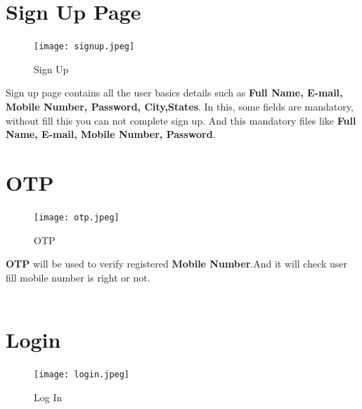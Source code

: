 \documentclass[twoside,a4paper,16pt]{book}
\begin{document}
\begin{itemize}
\begin{enumerate}
\begin{enumerate}
\newpage

\section{Sign Up Page}

\vspace{0.6cm}

\begin{figure}[ht!]
\begin{center}
\texttt{[image: signup.jpeg]}
\caption{Sign Up}
\end{center}
\end{figure}

 \vspace{0.2cm}


Sign up page contains all the user basics details such as {\bf Full Name, E-mail, Mobile Number, Password, City,States}. In this, some fields are mandatory, without fill this you can not complete sign up. And this mandatory files like {\bf  Full Name, E-mail, Mobile Number, Password}.



\newpage
\section{OTP}

\vspace{0.6cm}

\begin{figure}[ht!]
\begin{center}
\texttt{[image: otp.jpeg]}
\caption{OTP}
\end{center}
\end{figure}

 \vspace{0.2cm}


{\bf OTP} will be used to verify registered {\bf Mobile Number}.And it will check user fill mobile number is right or not.\\\\


\newpage
\section{Login}

\vspace{0.6cm}

\begin{figure}[ht!]
\begin{center}
\texttt{[image: login.jpeg]}
\caption{Log In}
\end{center}
\end{figure}


\end{enumerate}
\end{enumerate}
\end{itemize}
\end{document}

